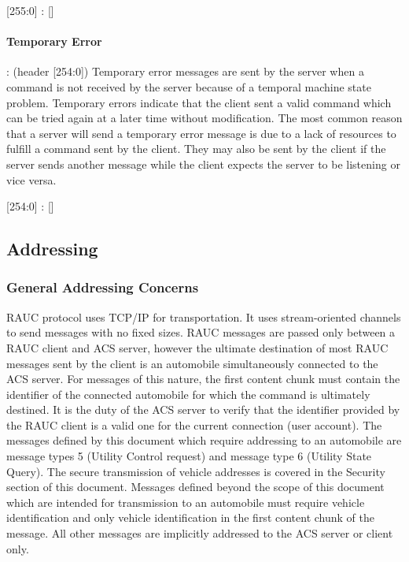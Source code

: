 \begin{center}
{\textsf{[255:0] : []}}
\end{center}

\paragraph{Temporary Error}: (header [254:0]) Temporary error messages are sent by the server when a command is not received by the server because of a temporal machine state problem. Temporary errors indicate that the client sent a valid command which can be tried again at a later time without modification. The most common reason that a server will send a temporary error message is due to a lack of resources to fulfill a command sent by the client. They may also be sent by the client if the server sends another message while the client expects the server to be listening or vice versa.

\begin{center}
{\textsf{[254:0] : []}}
\end{center}

\subsection{Addressing}
\label{sec:pdus:addr}
\subsubsection{General Addressing Concerns}
\textsf{RAUC} protocol uses TCP/IP for transportation. It uses stream-oriented channels to send messages with no fixed sizes. RAUC messages are passed only between a RAUC client and ACS server, however the ultimate destination of most RAUC messages sent by the client is an automobile simultaneously connected to the ACS server. For messages of this nature, the  first content chunk must contain the identifier of the connected automobile for which the command is ultimately destined. It is the duty of the ACS server to verify that the identifier provided by the RAUC client is a valid one for the current connection (user account).  The messages defined by this document which require addressing to an automobile are message types 5 (Utility Control request) and message type 6 (Utility State Query). The secure transmission of vehicle addresses is covered in the Security section of this document. Messages defined beyond the scope of this document which are intended for transmission to an automobile must require vehicle identification and only vehicle identification in the first content chunk of the message. All other messages are implicitly addressed to the ACS server or client only.  



